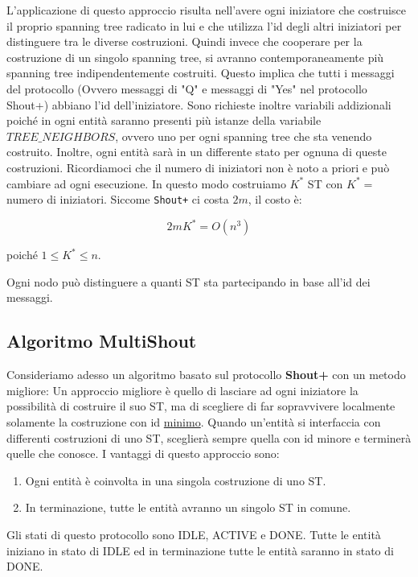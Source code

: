 L'applicazione di questo approccio risulta nell'avere ogni iniziatore che
costruisce il proprio spanning tree radicato in lui e che utilizza l'id degli
altri iniziatori per distinguere tra le diverse costruzioni. Quindi invece che
cooperare per la costruzione di un singolo spanning tree, si avranno
contemporaneamente più spanning tree indipendentemente costruiti. Questo implica
che  tutti i messaggi del protocollo (Ovvero messaggi di "Q" e messaggi di "Yes"
nel protocollo Shout+) abbiano l'id dell'iniziatore. Sono richieste inoltre
variabili addizionali poiché in ogni entità saranno presenti più istanze della
variabile $TREE\_NEIGHBORS$, ovvero uno per ogni spanning tree che sta venendo
costruito. Inoltre, ogni entità sarà in un differente stato per ognuna di queste
costruzioni. Ricordiamoci che il numero di iniziatori non è noto a priori e può
cambiare ad ogni esecuzione. In questo modo costruiamo $K^*$ ST con $K^*=$
numero di iniziatori. Siccome \texttt{Shout+} ci costa $2m$, il costo è:

$$2m K^* = O(n^3)$$

poiché $1 \leq K^* \leq n$. %

Ogni nodo può distinguere a quanti ST sta partecipando in base all'id dei
messaggi.

\subsection{Algoritmo MultiShout}
Consideriamo adesso un algoritmo basato sul protocollo \textbf{Shout+} con un
metodo migliore: Un approccio migliore è quello di lasciare ad ogni iniziatore
la possibilità di costruire il suo ST, ma di scegliere di far sopravvivere
localmente solamente la costruzione con id \underline{minimo}. Quando un'entità
si interfaccia con differenti costruzioni di uno ST, sceglierà sempre quella con
id minore e terminerà quelle che conosce. I vantaggi di questo approccio sono:

\begin{enumerate}
    \item Ogni entità è coinvolta in una singola costruzione di uno ST.
    \item In terminazione, tutte le entità avranno un singolo ST in comune.
\end{enumerate}

Gli stati di questo protocollo sono IDLE, ACTIVE e DONE. Tutte le entità
iniziano in stato di IDLE ed in terminazione tutte le entità saranno in stato di
DONE.

